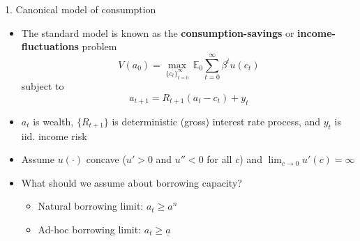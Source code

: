 \documentclass[10pt]{beamer}
\begin{document}
\begin{frame}{1. Canonical model of consumption}
\begin{itemize}
\item The standard model is known as the \textbf{consumption-savings} or \textbf{income-fluctuations} problem
\begin{equation*}
	V(a_0) = \max_{ \{c_t\}_{t=0}^\infty } \, \mathbb{E}_0 \sum_{t=0}^\infty \beta^t u(c_t)
\end{equation*}
subject to
\begin{equation*}
	a_{t+1} = R_{t+1} (a_t - c_t) + y_t
\end{equation*}

\item $a_t$ is wealth, $\{ R_{t+1} \}$ is deterministic (gross) interest rate process, and $y_t$ is iid. income risk

\item Assume $u(\cdot)$ concave ($u' > 0$ and $u''< 0$ for all $c$) and $\lim_{c \to 0} u'(c) = \infty$

\item What should we assume about borrowing capacity?
\begin{itemize}
\vspace{1mm}
\item Natural borrowing limit: $a_t \geq a^n$

\vspace{-2mm}
\item Ad-hoc borrowing limit: $a_t \geq \underline a$
\end{itemize}

\end{itemize}
\end{frame}
\end{document}
